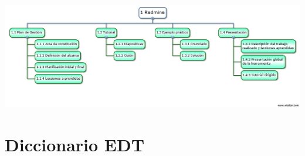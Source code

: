 \documentclass[a4paper,10pt]{scrartcl}
\begin{document}
	\begin{center}
		\includegraphics[width=\linewidth]{EDT}
	\end{center}

\section{Diccionario EDT}
\end{document}
